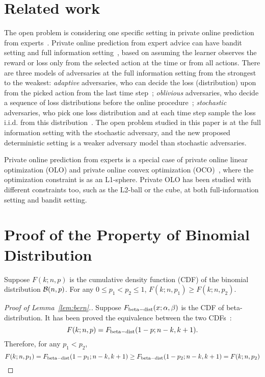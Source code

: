 \section{Related work}
The open problem is considering one specific setting in private online prediction from experts~\citep{asi2023private}.
Private online prediction from expert advice can have bandit setting and full information setting~\citep{guha2013nearly}, based on assuming the learner observes the reward or loss only from the selected action at the time or from all actions.
There are three models of adversaries at the full information setting from the strongest to the weakest: \textit{adaptive} adversaries, who can decide the loss (distribution) upon from the picked action from the last time step~\citep{jain2012differentially, guha2013nearly, jain2014near, agarwal2017price, asi2023private}; \textit{oblivious} adversaries, who decide a sequence of loss distributions before the online procedure~\citep{asi2023private}; \textit{stochastic} adversaries, who pick one loss distribution and at each time step sample the loss i.i.d. from this distribution~\citep{kairouz2021practical, hu2021near, asi2023private}.
The open problem studied in this paper is at the full information setting with the stochastic adversary, and the new proposed deterministic setting is a weaker adversary model than stochastic adversaries.

Private online prediction from experts is a special case of private online linear optimization (OLO) and private online convex optimization (OCO)~\citep{guha2013nearly, agarwal2017price, kairouz2021practical, agarwal2023differentially,asi2023near, pmlr-v235-agarwal24d}, where the optimization constraint is as an L1-sphere.
Private OLO has been studied with different constraints too, such as the L2-ball or the cube, at both full-information setting and bandit setting.

%


\section{Proof of the Property of Binomial Distribution}
\label{sec:app_bern}
\begin{lemma}
\label{lem:bern}
	Suppose $F(k; n, p)$ is the cumulative density function (CDF) of the binomial distribution $\mathcal{B}(n, p)$. For any $0\leq p_1 < p_2\leq 1$, $F(k; n, p_1)\geq F(k; n, p_2)$.
\end{lemma}
\begin{proof}[Proof of Lemma~\ref{lem:bern}.]
	Suppose $F_{\rm beta-dist}(x; \alpha, \beta)$ is the CDF of beta-distribution.
	It has been proved the equivalence between the two CDFs~\citep{wadsworth1960introduction}:
	$$
	F(k; n, p) = F_{\rm beta-dist}(1-p; n-k, k+1).
	$$
	Therefore, for any $p_1 < p_2$, 
	$$F(k; n, p_1) = F_{\rm beta-dist}(1-p_1; n-k, k+1)\geq F_{\rm beta-dist}(1-p_2; n-k, k+1) = F(k; n, p_2)$$
\end{proof}



